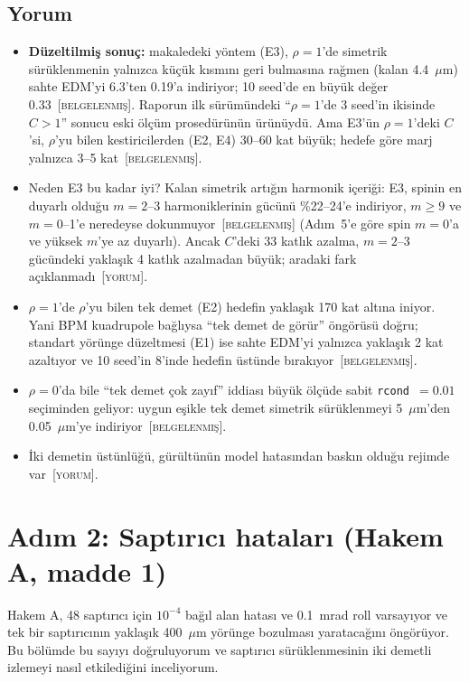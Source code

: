 \documentclass[11pt,a4paper]{article}
\newcommand{\kod}[1]{{\XeTeXinterchartokenstate=0\texttt{#1}}}
\newcommand{\BEL}{\textsc{[belgelenmiş]}}
\newcommand{\YOR}{\textsc{[yorum]}}
\begin{document}
\subsection{Yorum}
\begin{itemize}
\item \textbf{Düzeltilmiş sonuç:} makaledeki yöntem (E3), $\rho=1$'de simetrik sürüklenmenin yalnızca
küçük kısmını geri bulmasına rağmen (kalan 4.4~$\mu$m) sahte EDM'yi 6.3'ten 0.19'a indiriyor; 10 seed'de
en büyük değer 0.33~\BEL. Raporun ilk sürümündeki ``$\rho=1$'de 3 seed'in ikisinde $C>1$'' sonucu eski
ölçüm prosedürünün ürünüydü. Ama E3'ün $\rho=1$'deki $C$'si, $\rho$'yu bilen kestiricilerden (E2, E4)
30--60 kat büyük; hedefe göre marj yalnızca 3--5 kat~\BEL.
\item Neden E3 bu kadar iyi? Kalan simetrik artığın harmonik içeriği: E3, spinin en duyarlı olduğu
$m=2$--3 harmoniklerinin gücünü \%22--24'e indiriyor, $m\ge9$ ve $m=0$--1'e neredeyse dokunmuyor~\BEL
(Adım~5'e göre spin $m=0$'a ve yüksek $m$'ye az duyarlı). Ancak $C$'deki 33 katlık azalma, $m=2$--3
gücündeki yaklaşık 4 katlık azalmadan büyük; aradaki fark açıklanmadı~\YOR.
\item $\rho=1$'de $\rho$'yu bilen tek demet (E2) hedefin yaklaşık 170 kat altına iniyor. Yani BPM
kuadrupole bağlıysa ``tek demet de görür'' öngörüsü doğru; standart yörünge düzeltmesi (E1) ise sahte
EDM'yi yalnızca yaklaşık 2 kat azaltıyor ve 10 seed'in 8'inde hedefin üstünde bırakıyor~\BEL.
\item $\rho=0$'da bile ``tek demet çok zayıf'' iddiası büyük ölçüde sabit \kod{rcond}~$=0.01$
seçiminden geliyor: uygun eşikle tek demet simetrik sürüklenmeyi 5~$\mu$m'den 0.05~$\mu$m'ye indiriyor~\BEL.
\item İki demetin üstünlüğü, gürültünün model hatasından baskın olduğu rejimde var~\YOR.
\end{itemize}

\section{Adım 2: Saptırıcı hataları (Hakem A, madde 1)}

Hakem A, 48 saptırıcı için $10^{-4}$ bağıl alan hatası ve 0.1~mrad roll varsayıyor ve tek bir saptırıcının
yaklaşık 400~$\mu$m yörünge bozulması yaratacağını öngörüyor. Bu bölümde bu sayıyı doğruluyorum ve
saptırıcı sürüklenmesinin iki demetli izlemeyi nasıl etkilediğini inceliyorum.
\end{document}
